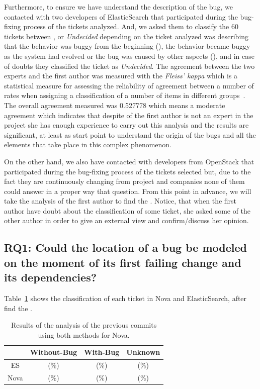\documentclass[a4paper, 12pt]{book}
\begin{document}
Furthermore, to ensure we have understand the description of the bug, we contacted with two developers of ElasticSearch that participated during the bug-fixing process of the tickets analyzed. And, we asked them to classify the 60 tickets between \BIC, \NoBIC or \emph{Undecided} depending on the ticket analyzed was describing that the behavior was buggy from the beginning (\BIC), the behavior became buggy as the system had evolved or the bug was caused by other aspects (\NoBIC), and in case of doubts they classified the ticket as \emph{Undecided}. The agreement between the two experts and the first author was measured with the \emph{Fleiss' kappa} which is a statistical measure for assessing the reliability of agreement between a number of rates when assigning a classification of a number of items in different groups~\cite{warrens2010inequalities}. The overall agreement measured was 0.527778 which means a moderate agreement which indicates that despite of the first author is not an expert in the project she has enough experience to carry out this analysis and the results are significant, at least as start point to understand the origin of the bugs and all the elements that take place in this complex phenomenon.

On the other hand, we also have contacted with developers from OpenStack that participated during the bug-fixing process of the tickets selected but, due to the fact they are continuously changing from project and companies none of them could answer in a proper way that question. From this point in advance, we will take the analysis of the first author to find the \FFC. Notice, that when the first author have doubt about the classification of some ticket, she asked some of the other author in order to give an external view and confirm/discuss her opinion.


\subsection{ RQ1: Could the location of a bug be modeled on the moment of its first failing change and its dependencies? }
Table~\ref{tableBugNoBug} shows the classification of each ticket in Nova and ElasticSearch, after find the \FFC. 
\begin{table}[!t]
	\renewcommand{\arraystretch}{1.3}
	\caption{Results of the analysis of the previous commits using both methods for Nova.}
	\label{tableBugNoBug}
	\centering
	\begin{tabular}{|c||c||c||c| }
		\hline
  		&  Without-Bug & With-Bug & Unknown \\
		\hline
		ES & (\%) &  (\%) &  (\%)\\
		Nova & (\%) &  (\%) & (\%)\\
		\hline
	\end{tabular}
\end{table}
\end{document}
